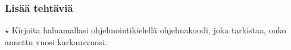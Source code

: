 \begin{tehtavasivu}

\subsubsection*{Lisää tehtäviä}

\begin{tehtava}
$\star$ Kirjoita haluamallasi ohjelmointikielellä ohjelmakoodi, joka tarkistaa, onko annettu vuosi karkausvuosi.
%	
%	
\end{tehtava}

\end{tehtavasivu}